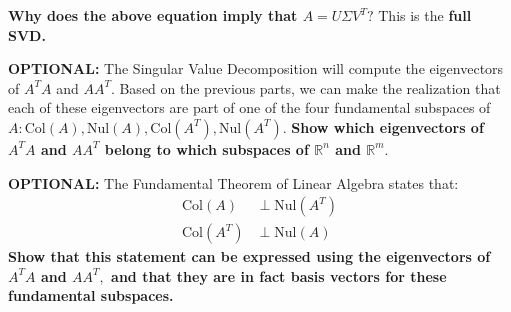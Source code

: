 \begin{enumerate}[resume]
  \qitem \textbf{Why does the above equation imply that $A = U \Sigma V^{T}?$} This is the \textbf{full SVD.}

  \ws{\vspace{50px}}


  \newpage

  \qitem \textbf{OPTIONAL:} The Singular Value Decomposition will compute the eigenvectors of $A^{T} A$ and $AA^{T}.$ 
  Based on the previous parts, we can make the realization that each of these eigenvectors are part of one of the four fundamental subspaces of $A: \text{Col}(A), \text{Nul}(A), \text{Col}(A^{T}), \text{Nul}(A^{T}).$
  \textbf{Show which eigenvectors of $A^{T} A$ and $AA^{T}$ belong to which subspaces of $\mathbb{R}^{n}$ and $\mathbb{R}^{m}.$}

  \ws{\vspace{100px}}


  \qitem \textbf{OPTIONAL:} The Fundamental Theorem of Linear Algebra states that:
  \begin{align*}
    \text{Col}(A) &\perp \text{Nul}(A^{T}) \\
    \text{Col}(A^{T}) &\perp \text{Nul}(A)
  \end{align*}  
  \textbf{Show that this statement can be expressed using the eigenvectors of $A^{T}A$ and $AA^{T},$ and that they are in fact basis vectors for these fundamental subspaces.}


\end{enumerate}
